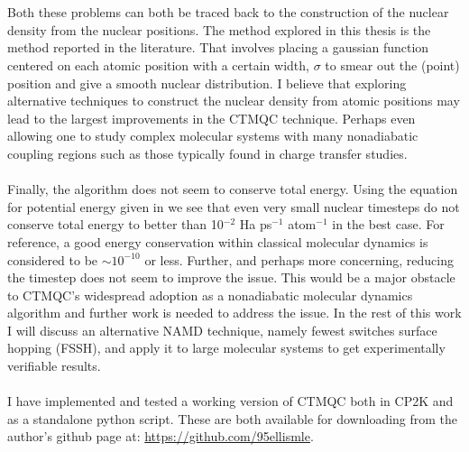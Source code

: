 \\\\
Both these problems can both be traced back to the construction of the nuclear density from the nuclear positions. The method explored in this thesis is the method reported in the literature. That involves placing a gaussian function centered on each atomic position with a certain width, $\sigma$ to smear out the (point) position and give a smooth nuclear distribution. I believe that exploring alternative techniques to construct the nuclear density from atomic positions may lead to the largest improvements in the CTMQC technique. Perhaps even allowing one to study complex molecular systems with many nonadiabatic coupling regions such as those typically found in charge transfer studies. 
\\\\
Finally, the algorithm does not seem to conserve total energy. Using the equation for potential energy given in \cite{agostini_semiclassical_2015} we see that even very small nuclear timesteps do not conserve total energy to better than 10$^{-2}$ Ha ps$^{-1}$ atom$^{-1}$ in the best case. For reference, a good energy conservation within classical molecular dynamics is considered to be $\sim 10^{-10}$ or less. Further, and perhaps more concerning, reducing the timestep does not seem to improve the issue. This would be a major obstacle to CTMQC's widespread adoption as a nonadiabatic molecular dynamics algorithm and further work is needed to address the issue. In the rest of this work I will discuss an alternative NAMD technique, namely fewest switches surface hopping (FSSH), and apply it to large molecular systems to get experimentally verifiable results.
\\\\
I have implemented and tested a working version of CTMQC both in CP2K and as a standalone python script. These are both available for downloading from the author's github page at: \href{https://github.com/95ellismle}{https://github.com/95ellismle}.
